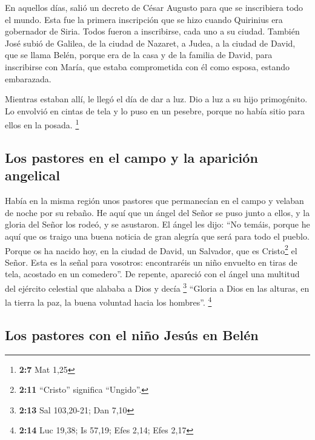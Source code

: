 \begin{paracol}{2}
 En aquellos días, salió un decreto de César Augusto para
que se inscribiera todo el mundo.  Esta fue la primera
inscripción que se hizo cuando Quirinius era gobernador de Siria.
 Todos fueron a inscribirse, cada uno a su ciudad.
 También José subió de Galilea, de la ciudad de Nazaret, a
Judea, a la ciudad de David, que se llama Belén, porque era de la casa y
de la familia de David,  para inscribirse con María, que
estaba comprometida con él como esposa, estando embarazada.

 Mientras estaban allí, le llegó el día de dar a luz.
 Dio a luz a su hijo primogénito. Lo envolvió en cintas de
tela y lo puso en un pesebre, porque no había sitio para ellos en la
posada. \footnote{\textbf{2:7} Mat 1,25}

\hypertarget{los-pastores-en-el-campo-y-la-apariciuxf3n-angelical}{%
\subsection{Los pastores en el campo y la aparición
angelical}\label{los-pastores-en-el-campo-y-la-apariciuxf3n-angelical}}

 Había en la misma región unos pastores que permanecían en
el campo y velaban de noche por su rebaño.  He aquí que un
ángel del Señor se puso junto a ellos, y la gloria del Señor los rodeó,
y se asustaron.  El ángel les dijo: ``No temáis, porque
he aquí que os traigo una buena noticia de gran alegría que será para
todo el pueblo.  Porque os ha nacido hoy, en la ciudad de
David, un Salvador, que es Cristo\footnote{\textbf{2:11} ``Cristo''
  significa ``Ungido''.} el Señor.  Esta es la señal para
vosotros: encontraréis un niño envuelto en tiras de tela, acostado en un
comedero''.  De repente, apareció con el ángel una
multitud del ejército celestial que alababa a Dios y decía \footnote{\textbf{2:13}
  Sal 103,20-21; Dan 7,10}  ``Gloria a Dios en las
alturas, en la tierra la paz, la buena voluntad hacia los hombres''.
\footnote{\textbf{2:14} Luc 19,38; Is 57,19; Efes 2,14; Efes 2,17}

\hypertarget{los-pastores-con-el-niuxf1o-jesuxfas-en-beluxe9n}{%
\subsection{Los pastores con el niño Jesús en
Belén}\label{los-pastores-con-el-niuxf1o-jesuxfas-en-beluxe9n}}


\end{paracol}
